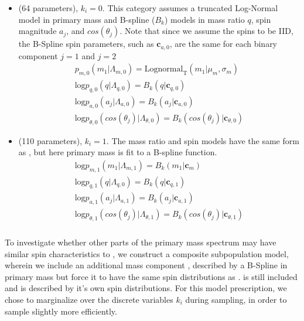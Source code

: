 \begin{itemize}
    \item \first{} (64 parameters), $k_i=0$. This category assumes a truncated Log-Normal model in primary mass and B-spline ($B_k$) models in mass ratio $q$, spin magnitude $a_j$, and $cos(\theta_j)$. Note that since we assume the spins to be IID, the B-Spline spin parameters, such as $\mathbf{c}_{a,0}$, are the same for each binary component $j=1$ and $j=2$
    \begin{eqnarray} \label{eq:peakAbase}
        p_{m,0}(m_1| \Lambda_{m,0}) = \text{Lognormal}_\text{T}(m_1 | \mu_{m}, \sigma_{m}) \\
        \text{log} p_{q,0}(q| \Lambda_{q,0}) = B_k(q | \mathbf{c}_{q,0}) \\
        \text{log} p_{a,0}(a_j| \Lambda_{a,0}) = B_k(a_j | \mathbf{c}_{a,0}) \\
        \text{log} p_{\theta,0}(cos(\theta_j)| \Lambda_{\theta,0}) = B_k( cos(\theta_j) | \mathbf{c}_{\theta,0})
    \end{eqnarray}

    \item \contB{} (110 parameters), $k_i=1$. The mass ratio and spin models have the same form as \first{}, but here primary mass is fit to a B-spline function. 
    \begin{eqnarray} \label{eq:contBbase}
        \text{log} p_{m,1}(m_1| \Lambda_{m,1}) = B_k(m_1 | \mathbf{c}_{m}) \\
        \text{log} p_{q,1}(q| \Lambda_{q,0}) = B_k(q | \mathbf{c}_{q,1}) \\
        \text{log} p_{a,1}(a_j| \Lambda_{a,1}) = B_k(a_j | \mathbf{c}_{a,1}) \\
        \text{log} p_{\theta,1}(cos(\theta_j)| \Lambda_{\theta,1}) = B_k( cos(\theta_j) | \mathbf{c}_{\theta,1})
    \end{eqnarray}

\end{itemize}

\subsubsection{\comp{}}

To investigate whether other parts of the primary mass spectrum may have similar spin characteristics to \first{}, we construct a composite subpopulation model, wherein we include an additional mass component \contA{}, described by a B-Spline in primary mass but force it to have the same spin distributions as \first{}. \contB{} is still included and is described by it's own spin distributions. For this model prescription, we chose to marginalize over the discrete variables $k_i$ during sampling, in order to sample slightly more efficiently. 

